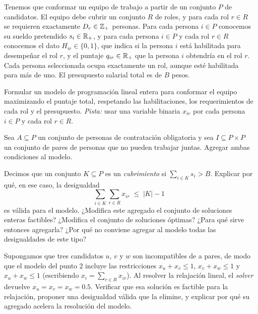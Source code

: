 \documentclass[11pt,a4paper]{article}
\begin{document}
\newpage
Tenemos que conformar un equipo de trabajo a partir de un conjunto $P$ de
candidatos. El equipo debe cubrir un conjunto $R$ de roles, y para cada rol
$r \in R$ se requieren exactamente $D_r \in \mathbb{Z}_+$ personas. Para cada persona
$i \in P$ conocemos su sueldo pretendido $s_i \in \mathbb{R}_+$, y para cada persona
$i \in P$ y cada rol $r \in R$ conocemos el dato $H_{ir} \in \{0,1\}$, que indica
si la persona $i$ está habilitada para desempeñar el rol $r$, y el puntaje
$q_{ir} \in \mathbb{R}_+$ que la persona $i$ obtendría en el rol $r$. Cada persona
seleccionada ocupa exactamente un rol, aunque esté habilitada para más de uno.
El presupuesto salarial total es de $B$ pesos.

\begin{puntos}
  \item Formular un modelo de programación lineal entera para conformar el
  equipo maximizando el puntaje total, respetando las habilitaciones, los
  requerimientos de cada rol y el presupuesto. \emph{Pista:} usar una variable
  binaria $x_{ir}$ por cada persona $i \in P$ y cada rol $r \in R$.

  \item Sea $A \subseteq P$ un conjunto de personas de contratación obligatoria
  y sea $I \subseteq P \times P$ un conjunto de pares de personas que no pueden
  trabajar juntas. Agregar ambas condiciones al modelo.

  \item Decimos que un conjunto $K \subseteq P$ es un \emph{cubrimiento} si
  $\sum_{i \in K} s_i > B$. Explicar por qué, en ese caso, la desigualdad
  \[
  \sum_{i \in K} \sum_{r \in R} x_{ir} \;\le\; |K| - 1
  \]
  es válida para el modelo. ¿Modifica este agregado el conjunto de soluciones
  enteras factibles? ¿Modifica el conjunto de soluciones óptimas? ¿Para qué
  sirve entonces agregarla? ¿Por qué no conviene agregar al modelo todas las
  desigualdades de este tipo?

  \item Supongamos que tres candidatos $u$, $v$ y $w$ son incompatibles de a
  pares, de modo que el modelo del punto 2 incluye las restricciones
  $x_u + x_v \le 1$, $x_v + x_w \le 1$ y $x_u + x_w \le 1$ (escribiendo
  $x_i = \sum_{r \in R} x_{ir}$). Al resolver la relajación lineal, el
  \emph{solver} devuelve $x_u = x_v = x_w = 0.5$. Verificar que esa solución es
  factible para la relajación, proponer una desigualdad válida que la elimine, y
  explicar por qué su agregado acelera la resolución del modelo.
\end{puntos}
\end{document}

